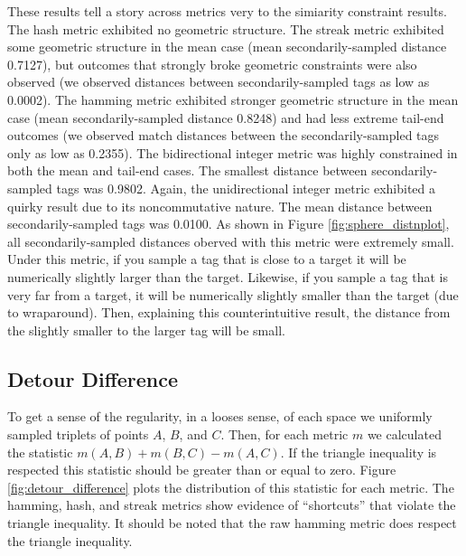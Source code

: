 These results tell a story across metrics very to the simiarity constraint results.
The hash metric exhibited no geometric structure.
The streak metric exhibited some geometric structure in the mean case (mean secondarily-sampled distance 0.7127), but outcomes that strongly broke geometric constraints were also observed (we observed distances between secondarily-sampled tags as low as 0.0002).
The hamming metric exhibited stronger geometric structure in the mean case (mean secondarily-sampled distance 0.8248) and had less extreme tail-end outcomes (we observed match distances between the secondarily-sampled tags only as low as 0.2355).
The bidirectional integer metric was highly constrained in both the mean and tail-end cases.
The smallest distance between secondarily-sampled tags was 0.9802.
Again, the unidirectional integer metric exhibited a quirky result due to its noncommutative nature.
The mean distance between secondarily-sampled tags was 0.0100.
As shown in Figure \ref{fig:sphere_distnplot}, all secondarily-sampled distances oberved with this metric were extremely small.
Under this metric, if you sample a tag that is close to a target it will be numerically slightly larger than the target.
Likewise, if you sample a tag that is very far from a target, it will be numerically slightly smaller than the target (due to wraparound).
Then, explaining this counterintuitive result, the distance from the slightly smaller to the larger tag will be small.

\subsection{Detour Difference}



To get a sense of the regularity, in a looses sense, of each space we uniformly sampled triplets of points $A$, $B$, and $C$.
Then, for each metric $m$ we calculated the statistic $m(A, B) + m(B, C) - m(A, C)$.
If the triangle inequality is respected this statistic should be greater than or equal to zero.
Figure \ref{fig:detour_difference} plots the distribution of this statistic for each metric.
The hamming, hash, and streak metrics show evidence of ``shortcuts'' that violate the triangle inequality.
It should be noted that the raw hamming metric does respect the triangle inequality.



